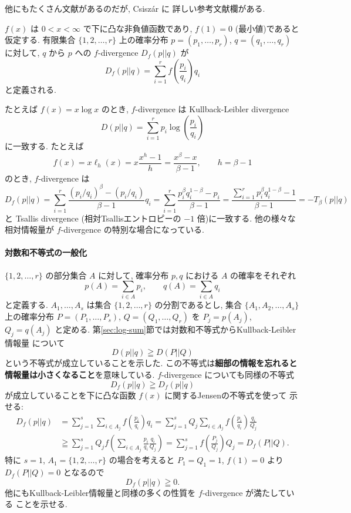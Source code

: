 \documentclass[12pt,twoside]{jarticle}
\theoremstyle{jplain}
\theoremstyle{jplain}
\theoremstyle{jplain}
\numberwithin{theorem}{section}
\numberwithin{equation}{section}
\numberwithin{figure}{section}
\numberwithin{table}{section}
\newcommand\secref[1]{第\ref{#1}節}
\begin{document}
他にもたくさん文献があるのだが, Csisz\'ar \cite{Csiszar2008} に
詳しい参考文献欄がある.

$f(x)$ は $0<x<\infty$ で下に凸な非負値函数であり, $f(1)=0$ (最小値)であると仮定する.
有限集合 $\{1,2,\ldots,r\}$ 上の確率分布 $p=(p_1,\ldots,p_r)$,
$q=(q_1,\ldots,q_r)$ に対して, $q$ から $p$ への $f$-divergence $D_f(p||q)$ が
\[
D_f(p||q)=\sum_{i=1}^r f\left(\frac{p_i}{q_i}\right)q_i
\]
と定義される. 

たとえば $f(x)=x\log x$ のとき, $f$-divergence は Kullback-Leibler divergence
\[
D(p||q)=\sum_{i=1}^r p_i\log\left(\frac{p_i}{q_i}\right)
\]
に一致する. たとえば
\[
f(x)=x\ell_h(x)=x\frac{x^h-1}{h}=\frac{x^\beta-x}{\beta-1},
\qquad h=\beta-1
\]
のとき, $f$-divergence は
\[
D_f(p||q)
=\sum_{i=1}^r\frac{(p_i/q_i)^\beta-(p_i/q_i)}{\beta-1}q_i
=\sum_{i=1}^r\frac{p_i^\beta q_i^{1-\beta}-p_i}{\beta-1}
=\frac{\sum_{i=1}^r p_i^\beta q_i^{1-\beta}-1}{\beta-1}
=-T_\beta(p||q)
\]
と Tsallis divergence (相対Tsallisエントロピーの $-1$ 倍)に一致する.
他の様々な相対情報量が $f$-divergence の特別な場合になっている.

\paragraph{対数和不等式の一般化}
$\{1,2,\ldots,r\}$ の部分集合 $A$ に対して, 
確率分布 $p,q$ における $A$ の確率をそれぞれ
\[
p(A) = \sum_{i\in A} p_i, \qquad
q(A) = \sum_{i\in A} q_i
\]
と定義する. $A_1,\ldots,A_s$ は集合 $\{1,2,\ldots,r\}$ の分割であるとし, 
集合 $\{A_1,A_2,\ldots,A_s\}$ 上の確率分布
$P=(P_1,\ldots,P_s)$, $Q=(Q_1,\ldots,Q_r)$ を $P_j=p(A_j)$, $Q_j=q(A_j)$ 
と定める. \secref{sec:log-sum}では対数和不等式からKullback-Leibler情報量
について
\[
D(p||q)\geqq D(P||Q)
\]
という不等式が成立していることを示した. 
この不等式は{\bf 細部の情報を忘れると情報量は小さくなること}を意味している.
$f$-divergence についても同様の不等式
\[
D_f(p||q)\geqq D_f(p||q)
\]
が成立していることを下に凸な函数 $f(x)$ に関するJensenの不等式を使って
示せる:
\begin{align*}
D_f(p||q)
&
=\sum_{j=1}^s\sum_{i\in A_j} f\left(\frac{p_i}{q_i}\right)q_i
=\sum_{j=1}^s Q_j \sum_{i\in A_j} f\left(\frac{p_i}{q_i}\right)\frac{q_i}{Q_j}
\\ &
\geqq\sum_{j=1}^s Q_j f\left(\sum_{i\in A_j}\frac{p_i}{q_i}\frac{q_i}{Q_j}\right)
=\sum_{j=1}^s f\left(\frac{P_j}{Q_j}\right)Q_j
=D_f(P||Q).
\end{align*}
特に $s=1$, $A_1=\{1,2,\ldots,r\}$ の場合を考えると $P_1=Q_1=1$, $f(1)=0$
より $D_f(P||Q)=0$ となるので
\[
D_f(p||q)\geqq 0.
\]
他にもKullback-Leibler情報量と同様の多くの性質を $f$-divergence が満たしている
ことを示せる.
\end{document}
